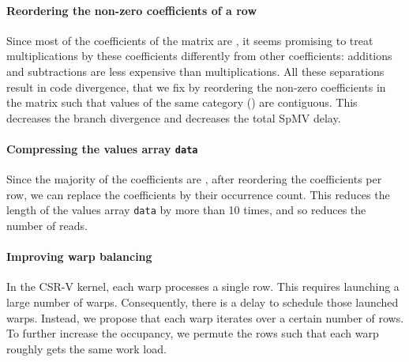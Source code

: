 \documentclass[runningheads,orivec]{llncs}
\begin{document}
\paragraph{\bf Reordering the non-zero coefficients of a row}
\label{Reordering non-zeros}
Since most of the coefficients of the matrix are , it seems promising to treat multiplications by these coefficients differently from other coefficients: additions and subtractions are less expensive than multiplications. All these separations result in code divergence, that we fix by reordering the non-zero coefficients in the matrix such that values of the same category () are contiguous. This decreases the branch divergence and decreases the total SpMV delay.  

\paragraph{\bf Compressing the values array \texttt{data}}
Since the majority of the coefficients are , after reordering the coefficients per row, we can replace the  coefficients by their occurrence count. This reduces the length of the values array \texttt{data} by more than 10 times, and so reduces the number of reads. 

\paragraph{\bf Improving warp balancing}
In the CSR-V kernel, each warp processes a single row. This requires launching a large number of warps. Consequently, there is a delay to schedule those launched warps. Instead, we propose that each warp iterates over a certain number of rows. To further increase the occupancy, we permute the rows such that each warp roughly gets the same work load.

\vspace*{-0.25cm}
\end{document}
